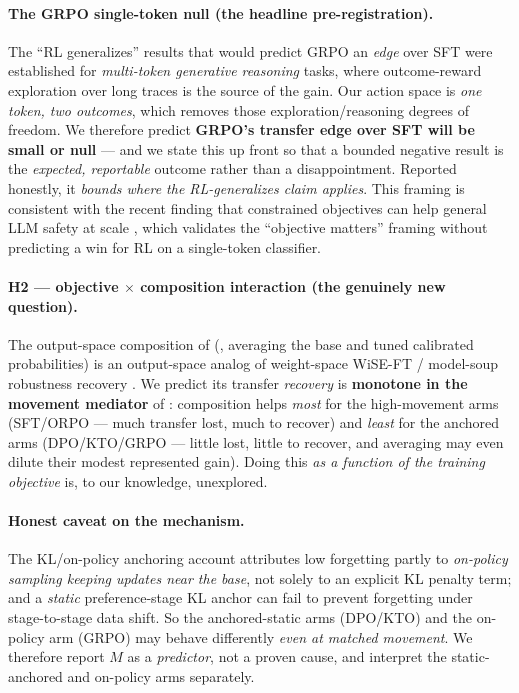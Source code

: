 \paragraph{The GRPO single-token null (the headline pre-registration).} The ``RL generalizes'' results
that would predict GRPO an \emph{edge} over SFT were established for \emph{multi-token generative reasoning}
tasks, where outcome-reward exploration over long traces is the source of the gain. Our action space is
\emph{one token, two outcomes}, which removes those exploration/reasoning degrees of freedom. We therefore
predict \textbf{GRPO's transfer edge over SFT will be small or null} --- and we state this up front so that
a bounded negative result is the \emph{expected, reportable} outcome rather than a disappointment. Reported
honestly, it \emph{bounds where the RL-generalizes claim applies}. This framing is consistent with the
recent finding that constrained objectives can help general LLM safety at scale
\citep{vennemeyer2026objective}, which validates the ``objective matters'' framing without predicting a win
for RL on a single-token classifier.

\paragraph{H2 --- objective $\times$ composition interaction (the genuinely new question).} The
output-space composition of  (, averaging the base and tuned calibrated
probabilities) is an output-space analog of weight-space WiSE-FT / model-soup robustness recovery
\citep{wortsman2022wiseft,wortsman2022modelsoups}. We predict its transfer \emph{recovery} is
\textbf{monotone in the movement mediator} of : composition helps \emph{most} for the
high-movement arms (SFT/ORPO --- much transfer lost, much to recover) and \emph{least} for the anchored
arms (DPO/KTO/GRPO --- little lost, little to recover, and averaging may even dilute their modest
represented gain). Doing this \emph{as a function of the training objective} is, to our knowledge,
unexplored.

\paragraph{Honest caveat on the mechanism.} The KL/on-policy anchoring account attributes low forgetting
partly to \emph{on-policy sampling keeping updates near the base}, not solely to an explicit KL penalty
term; and a \emph{static} preference-stage KL anchor can fail to prevent forgetting under stage-to-stage
data shift. So the anchored-static arms (DPO/KTO) and the on-policy arm (GRPO) may behave differently
\emph{even at matched movement}. We therefore report $M$ as a \emph{predictor}, not a proven cause, and
interpret the static-anchored and on-policy arms separately.

